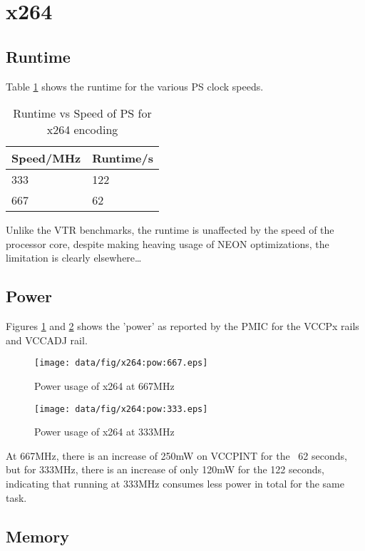 \documentclass[a4paper]{article}
\begin{document}
\section{x264}
  \subsection{Runtime}
    Table \ref{tab:x264:rt} shows the runtime for the various PS clock speeds.
    \begin{table}[bp]
      \centering
      \begin{tabular}{l | l}
        Speed/MHz & Runtime/s \\
        \hline
        333 & 122 \\
        667 & 62 \\
      \end{tabular}
      \caption{Runtime vs Speed of PS for x264 encoding}
      \label{tab:x264:rt}
    \end{table}
    Unlike the VTR benchmarks, the runtime is unaffected by the speed of the processor core, despite making heaving usage of NEON optimizations, the limitation is clearly elsewhere\ldots

  \subsection{Power}
    Figures \ref{fig:x264:pow:667} and \ref{fig:x264:pow:333} shows the 'power' as reported by the PMIC for the VCCPx rails and VCCADJ rail.
    \begin{figure}[p]
      \texttt{[image: data/fig/x264:pow:667.eps]}
      \caption{Power usage of x264 at 667MHz}
      \label{fig:x264:pow:667}
    \end{figure}
    \begin{figure}[p]
      \texttt{[image: data/fig/x264:pow:333.eps]}
      \caption{Power usage of x264 at 333MHz}
      \label{fig:x264:pow:333}
    \end{figure}
    At 667MHz, there is an increase of 250mW on VCCPINT for the ~62 seconds, but for 333MHz, there is an increase of only 120mW for the 122 seconds, indicating that running at 333MHz consumes less power in total for the same task.


  \subsection{Memory}
\end{document}

